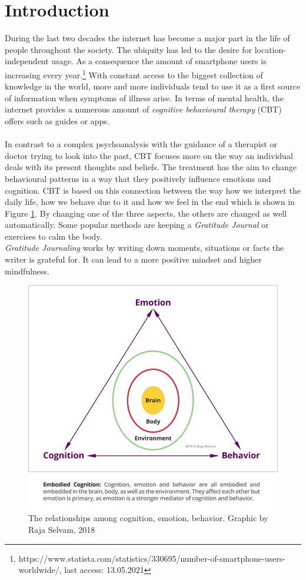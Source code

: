 \documentclass[sigconf, nonacm]{acmart}
\begin{document}
\section{Introduction}
During the last two decades the internet has become a major part in the life
of people throughout the society. The ubiquity has led to the desire for 
location-independent usage. As a consequence the amount of
smartphone users is increasing every year.\footnote{https://www.statista.com/statistics/330695/number-of-smartphone-users-worldwide/, last access: 13.05.2021}
With constant access to the biggest collection of knowledge in the world,
more and more individuals tend to use it as a first source of information when
symptoms of illness arise\cite{Wyatt2015}. 
In terms of mental health, the internet provides a numerous amount of \emph{cognitive behavioural therapy} (CBT) offers such as guides
or apps. 
\\\\
In contrast to a complex psychoanalysis with the guidance of a therapist or doctor trying to look into the past,
CBT focuses more on the way an individual deals with its present thoughts and beliefs. The treatment has the aim to
change behavioural patterns in a way that they positively influence emotions and cognition. CBT is based on this connection
between the way how we interpret the daily life, how we behave due to it and how we 
feel in the end which is shown in Figure \ref{fig:cbt_circle}. By changing one of the three aspects,
the others are changed as well automatically. Some popular methods are keeping a \emph{Gratitude Journal} or exercises to calm the body.\cite{Spangler2002}
\\
\emph{Gratitude Journaling} works by writing down moments, situations or facts the writer is grateful for. It can lead to a more positive mindset and higher mindfulness. 
\begin{figure}[h]
  \centering
  \includegraphics[width=\linewidth]{cbt_picture}
  \caption[cbt_circle]{The relationships among cognition, emotion, behavior. Graphic by Raja Selvam, 2018\footnotemark}
  \label{fig:cbt_circle}
\end{figure}
\end{document}
